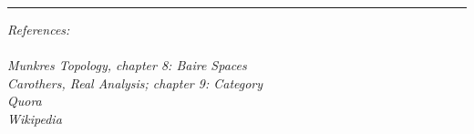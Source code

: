 \documentclass[12pt]{article}
\begin{document}
\noindent\rule[0.5ex]{\linewidth}{1pt}
\textit{ References:\\ \\
 Munkres Topology, chapter 8: Baire Spaces\\
 Carothers, Real Analysis; chapter 9: Category\\
 Quora\\
 Wikipedia\\
 }
\end{document}
